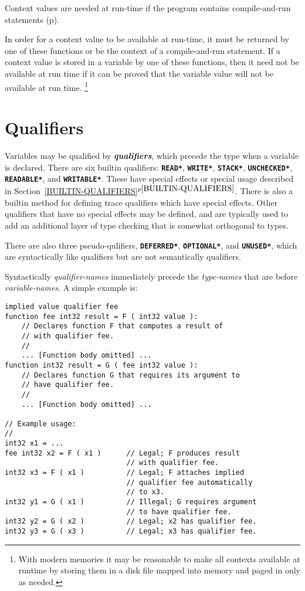\documentclass[12pt]{article}
\newcommand{\TT}[1]{{\tt \bfseries #1}}
\newcommand{\skey}[2]{{\bf \em #1#2}\index{#1}}
\newcommand{\itemref}[1]{\ref{#1}$^{p\pageref{#1}}$}
\newcommand{\pagref}[1]{p\pageref{#1}}
\newenvironment{indpar}[1][0.3in]%
	{\begin{list}{}%
		     {\setlength{\itemsep}{0in}%
		      \setlength{\topsep}{0in}%
		      \setlength{\parsep}{1ex}%
		      \setlength{\labelwidth}{#1}%
		      \setlength{\leftmargin}{#1}%
		      \addtolength{\leftmargin}{\labelsep}}%
	 \item}%
	{\end{list}}
\begin{document}
Context values are needed at run-time if the program contains
compile-and-run statements (\pagref{COMPILE-AND-RUN-ASSIGNMENT-STATEMENTS}).

In order for a context value to be available at run-time, it
must be returned by one of these functions or be the context of
a compile-and-run statement.
If a context value is stored in a variable by one of these functions,
then it need not be available at run time if it can be proved that the
variable value will not be available at run time.%
\footnote{With modern memories it may be reasonable
to make all contexts available at runtime by storing them
in a disk file mapped into memory and paged in only as needed.}

\section{Qualifiers}
\label{QUALIFIERS}

Variables may be qualified by \skey{qualifier}s, which precede the
type when a variable is declared.  There are six builtin qualifiers:
\TT{*READ*}, \TT{*WRITE*}, \TT{*STACK*}, \TT{*UNCHECKED*},
\TT{*READABLE*}, and \TT{*WRITABLE*}.
These have special effects or special usage
described in Section~\itemref{BUILTIN-QUALIFIERS}.
There is also a builtin method for defining trace qualifiers which
have special effects.
Other qualifiers that have no special effects
may be defined, and are typically used to add an
additional layer of type checking that is somewhat orthogonal to
types.

There are also three pseudo-qulifiers,
\TT{*DEFERRED*}, \TT{*OPTIONAL*}, and \TT{*UNUSED*},
which are syntactically like qualifiers but are not semantically
qualifiers.

Syntactically {\em qualifier-names} immediately precede the {\em type-names}
that are before {\em variable-names}.  A simple example is:
\begin{indpar}\begin{verbatim}
implied value qualifier fee
function fee int32 result = F ( int32 value ):
    // Declares function F that computes a result of
    // with qualifier fee.
    //
    ... [Function body omitted] ...
function int32 result = G ( fee int32 value ):
    // Declares function G that requires its argument to
    // have qualifier fee.
    //
    ... [Function body omitted] ...

// Example usage:
//
int32 x1 = ...
fee int32 x2 = F ( x1 )      // Legal; F produces result
                             // with qualifier fee.
int32 x3 = F ( x1 )          // Legal; F attaches implied
                             // qualifier fee automatically
                             // to x3.
int32 y1 = G ( x1 )          // Illegal; G requires argument
                             // to have qualifier fee.
int32 y2 = G ( x2 )          // Legal; x2 has qualifier fee.
int32 y3 = G ( x3 )          // Legal; x3 has qualifier fee.

\end{verbatim}\end{indpar}
\end{document}
